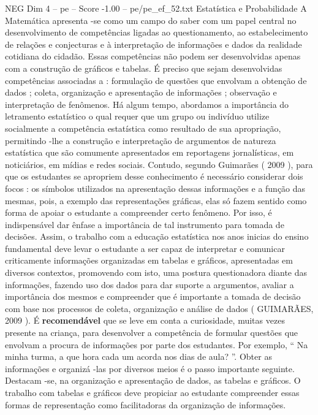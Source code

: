 \begin{textsample}{NEG Dim 4 – pe – Score -1.00 – pe/pe\_ef\_52.txt}  \label{ex:f4_neg_016}
Estatística e Probabilidade A Matemática apresenta -se como um campo do saber com um papel central no desenvolvimento de competências ligadas ao questionamento, ao estabelecimento de relações e conjecturas e à interpretação de informações e dados da realidade cotidiana do cidadão.
Essas competências não podem ser desenvolvidas apenas com a construção de gráficos e tabelas.
É preciso que sejam desenvolvidas competências associadas a : formulação de questões que envolvam a obtenção de dados ; coleta, organização e apresentação de informações ; observação e interpretação de fenômenos.
Há algum tempo, abordamos a importância do letramento estatístico o qual requer que um grupo ou indivíduo utilize socialmente a competência estatística como resultado de sua apropriação, permitindo -lhe a construção e interpretação de argumentos de natureza estatística que são comumente apresentados em reportagens jornalísticas, em noticiários, em mídias e redes sociais.
Contudo, segundo Guimarães ( 2009 ), para que os estudantes se apropriem desse conhecimento é necessário considerar dois focos : os símbolos utilizados na apresentação dessas informações e a função das mesmas, pois, a exemplo das representações gráficas, elas só fazem sentido como forma de apoiar o estudante a compreender certo fenômeno.
Por isso, é indispensável dar ênfase a importância de tal instrumento para tomada de decisões.
Assim, o trabalho com a educação estatística nos anos inicias do ensino fundamental deve levar o estudante a ser capaz de interpretar e comunicar criticamente informações organizadas em tabelas e gráficos, apresentadas em diversos contextos, promovendo com isto, uma postura questionadora diante das informações, fazendo uso dos dados para dar suporte a argumentos, avaliar a importância dos mesmos e compreender que é importante a tomada de decisão com base nos processos de coleta, organização e análise de dados ( GUIMARÃES, 2009 ).
É \textbf{recomendável} que se leve em conta a curiosidade, muitas vezes presente na criança, para desenvolver a competência de formular questões que envolvam a procura de informações por parte dos estudantes.
Por exemplo, “ Na minha turma, a que hora cada um acorda nos dias de aula? ”.
Obter as informações e organizá -las por diversos meios é o passo importante seguinte.
Destacam -se, na organização e apresentação de dados, as tabelas e gráficos.
O trabalho com tabelas e gráficos deve propiciar ao estudante compreender essas formas de representação como facilitadoras da organização de informações.

\end{textsample}
